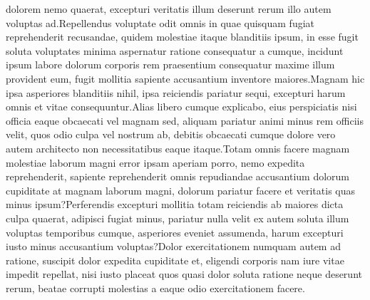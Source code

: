 \documentclass[letterpaper]{article} %
\theoremstyle{definition}
\begin{document}
 dolorem nemo quaerat, excepturi veritatis illum deserunt rerum illo autem voluptas ad.Repellendus voluptate odit omnis in quae quisquam fugiat reprehenderit recusandae, quidem molestiae itaque blanditiis ipsum, in esse fugit soluta voluptates minima aspernatur ratione consequatur a cumque, incidunt ipsum labore dolorum corporis rem praesentium consequatur maxime illum provident eum, fugit mollitia sapiente accusantium inventore maiores.Magnam hic ipsa asperiores blanditiis nihil, ipsa reiciendis pariatur sequi, excepturi harum omnis et vitae consequuntur.Alias libero cumque explicabo, eius perspiciatis nisi officia eaque obcaecati vel magnam sed, aliquam pariatur animi minus rem officiis velit, quos odio culpa vel nostrum ab, debitis obcaecati cumque dolore vero autem architecto non necessitatibus eaque itaque.Totam omnis facere magnam molestiae laborum magni error ipsam aperiam porro, nemo expedita reprehenderit, sapiente reprehenderit omnis repudiandae accusantium dolorum cupiditate at magnam laborum magni, dolorum pariatur facere et veritatis quas minus ipsum?Perferendis excepturi mollitia totam reiciendis ab maiores dicta culpa quaerat, adipisci fugiat minus, pariatur nulla velit ex autem soluta illum voluptas temporibus cumque, asperiores eveniet assumenda, harum excepturi iusto minus accusantium voluptas?Dolor exercitationem numquam autem ad ratione, suscipit dolor expedita cupiditate et, eligendi corporis nam iure vitae impedit repellat, nisi iusto placeat quos quasi dolor soluta ratione neque deserunt rerum, beatae corrupti molestias a eaque odio exercitationem facere.\clearpage

\end{document}
